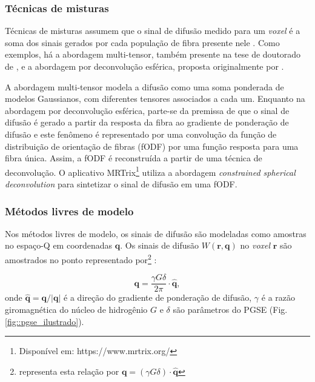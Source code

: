 \documentclass[
    12pt,                %
    oneside,            %
    a4paper,            %
    english,            %
    french,                %
    spanish,            %
    brazil                %
    ]{abntex2}
\begin{document}
\subsubsection{Técnicas de misturas}

Técnicas de misturas assumem que o sinal de difusão medido para um \textit{voxel} é a soma dos sinais gerados por cada população de fibra presente nele \cite{tournier2011}. Como exemplos, há a abordagem multi-tensor, também presente na tese de doutorado de , e a abordagem por deconvolução esférica, proposta originalmente por .

A abordagem multi-tensor modela a difusão como uma soma ponderada de modelos Gaussianos, com diferentes tensores associados a cada um. Enquanto na abordagem por deconvolução esférica, parte-se da premissa de que o sinal de difusão é gerado a partir da resposta da fibra ao gradiente de ponderação de difusão e este fenômeno é representado por uma convolução da função de distribuição de orientação de fibras (fODF) por uma função resposta para uma fibra única. Assim, a fODF é reconstruída a partir de uma técnica de deconvolução. O aplicativo MRTrix\footnote{Disponível em: https://www.mrtrix.org/} utiliza a abordagem \textit{constrained spherical deconvolution} \cite{tournier2007} para sintetizar o sinal de difusão em uma fODF.

\subsubsection{Métodos livres de modelo}
\label{metodos_livres_de_modelo}


Nos métodos livres de modelo, os sinais de difusão são modeladas como amostras no espaço-Q em coordenadas $\mathbf{q}$. Os sinais de difusão $W(\mathbf{r}, \mathbf{q})$ no \textit{voxel} $\mathbf{r}$ são amostrados no ponto representado por\footnote{ representa esta relação por $\mathbf{q} = (\gamma G \delta)\cdot \mathbf{\hat{q}}$} \cite{yeh2010}:

\begin{equation}
    \label{eq::ting}
    \mathbf{q} = \frac{\gamma G \delta}{2\pi} \cdot \mathbf{\hat{q}},
\end{equation}
onde $\mathbf{\hat{q}} = \mathbf{q}/|\mathbf{q}|$ é a direção do gradiente de ponderação de difusão, $\gamma$ é a razão giromagnética do núcleo de hidrogênio $G$ e $\delta$ são parâmetros do PGSE (Fig. \ref{fig::pgse_ilustrado}).
\end{document}
